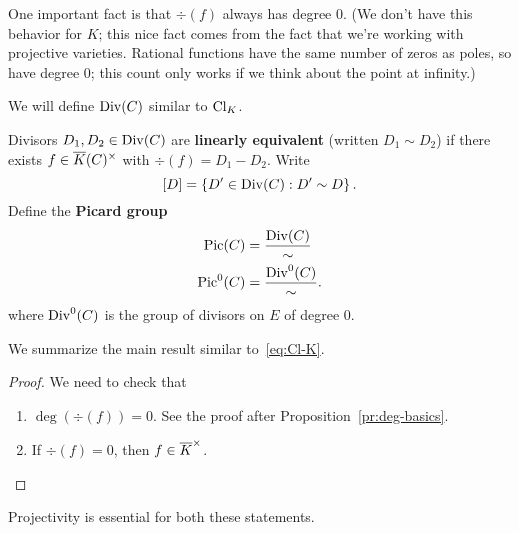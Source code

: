 One important fact is that $\div(f)$ always has degree 0. (We don't have this behavior for $K$; this nice fact comes from the fact that we're working with projective varieties. Rational functions have the same number of zeros as poles, so have degree 0; this count only works if we think about the point at infinity.)

We will define $\operatorname{Div}(C)$ similar to $\operatorname{Cl}_K$.
\begin{df}
Divisors $D_1,D_2\in \operatorname{Div}(C)$ are \textbf{linearly equivalent} (written $D_1\sim D_2$) if there exists $f\in \overline{K}(C)^{\times}$ with $\div(f)=D_1-D_2$. Write
\[
[D]=\left\{{D'\in \operatorname{Div}(C)}:{D'\sim D}\right\}.
\]
Define the \textbf{Picard group}
\begin{align*}
\operatorname{Pic}(C)&=\frac{\operatorname{Div}(C)}{\sim}\\
\operatorname{Pic}^0(C)&=\frac{\operatorname{Div}^0(C)}{\sim}.
\end{align*}
where $\operatorname{Div}^0(C)$ is the group of divisors on $E$ of degree 0. %
\end{df}

We summarize the main result similar to~\eqref{eq:Cl-K}.


\begin{proof}
We need to check that
\begin{enumerate}
\item
$\deg(\div(f))=0$. See the proof after Proposition~\ref{pr:deg-basics}.
\item
If $\div(f)=0$, then $f\in \overline{K}^{\times}$. 
\end{enumerate}
\end{proof}
Projectivity is essential for both these statements.

